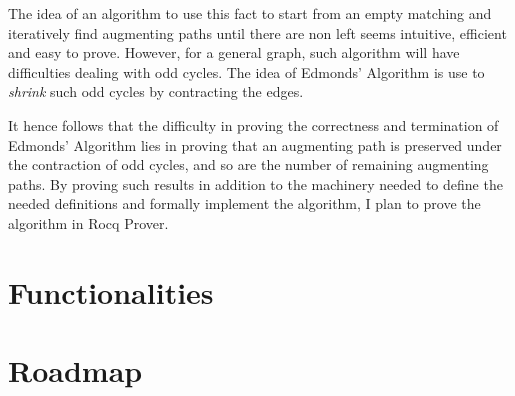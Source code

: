 \documentclass[acmsmall, screen, nonacm]{acmart}
\begin{document}
The idea of an algorithm to use this fact to start from an empty matching and iteratively find augmenting paths until there are non left seems intuitive, efficient and easy to prove. However, for a general graph, such algorithm will have difficulties dealing with odd cycles. The idea of Edmonds' Algorithm is use to \textit{shrink} such odd cycles by contracting the edges. 

It hence follows that the difficulty in proving the correctness and termination of Edmonds' Algorithm lies in proving that an augmenting path is preserved under the contraction of odd cycles, and so are the number of remaining augmenting paths. By proving such results in addition to the machinery needed to define the needed definitions and formally implement the algorithm, I plan to prove the algorithm in Rocq Prover.

\section{Functionalities}


\section{Roadmap}


{}
\end{document}
